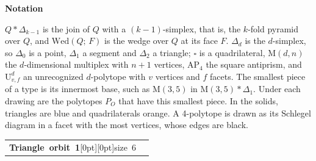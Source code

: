 \documentclass[14pt]{extarticle}
\makeatletter
\newcommand{\AtlasSupportOrbitSplit}[2]{%
  \begin{tabularx}{\linewidth}[t]{%
    @{}>{\raggedright\arraybackslash}p{.37\linewidth}%
    @{\hspace{2.5mm}\AtlasOrbitDivider\hspace{2.5mm}}%
    >{\raggedright\arraybackslash}X@{}}%
    \begin{minipage}[t]{\linewidth}\vspace{0pt}#1\end{minipage} &
    \begin{minipage}[t]{\linewidth}\vspace{0pt}#2\end{minipage}
  \end{tabularx}}
\makeatother
\begin{document}
\begin{atlaspanel}
{\Large\bfseries Notation}\par\vspace{2mm}
\(Q\ast\Delta_{k-1}\) is the join of \(Q\) with a \((k-1)\)-simplex, that is,
the \(k\)-fold pyramid over \(Q\), and \(\mathrm{Wed}(Q;\,F)\) is the wedge
over \(Q\) at its face \(F\).  \(\Delta_d\) is the \(d\)-simplex, so \(\Delta_0\)
is a point, \(\Delta_1\) a segment and \(\Delta_2\) a triangle;
\(\square\) is a quadrilateral, \(\mathrm{M}(d,n)\) the \(d\)-dimensional
multiplex with \(n+1\) vertices, \(\mathrm{AP}_4\) the square antiprism, and
\(\mathrm{U}^d_{v,f}\) an unrecognized \(d\)-polytope with \(v\) vertices and
\(f\) facets.  The smallest piece of a type is its innermost base, such as
\(\mathrm{M}(3,5)\) in \(\mathrm{M}(3,5)\ast\Delta_1\).  Under each drawing
are the polytopes \(P_O\) that have this smallest piece.
In the solids, triangles are blue and quadrilaterals orange.  A 4-polytope is
drawn as its Schlegel diagram in a facet with the most vertices, whose edges
are black.
\end{atlaspanel}
\clearpage
\begin{atlaspanel}[top=1mm,bottom=2mm]
\AtlasSupportOrbitSplit{%
\vspace*{-3mm}\mbox{{\LARGE\bfseries Triangle orbit 1}\hspace{3mm}\raisebox{.8mm}[0pt][0pt]{{\fontsize{16}{18}\selectfont\color{muted}size 6}}}%
}{%
\vspace*{-3mm}{\fontsize{13}{16}\selectfont{\color{muted}\(\mathbb{Q}\) and \(\mathbb{F}_2\)}\quad{\color{muted}\(\underline{\{7,\,18,\,41\}}\), \(\{6,\,18,\,40\}\), \(\{11,\,12,\,35\}\), \(\{6,\,35,\,40\}\), \(\{11,\,12,\,36\}\), \(\{7,\,36,\,41\}\)}\rule[-3mm]{0pt}{3mm}}%
}%
\end{atlaspanel}\vspace{2mm}
\end{document}
